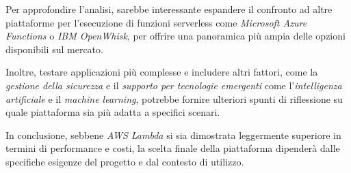 Per approfondire l’analisi, sarebbe interessante espandere il confronto ad altre piattaforme per l'esecuzione di funzioni serverless come \textit{Microsoft Azure Functions} o \textit{IBM OpenWhisk}, per offrire una panoramica più ampia delle opzioni disponibili sul mercato. 

Inoltre, testare applicazioni più complesse e includere altri fattori, come la \textit{gestione della sicurezza} e il \textit{supporto per tecnologie emergenti} come l'\textit{intelligenza artificiale} e il \textit{machine learning}, potrebbe fornire ulteriori spunti di riflessione su quale piattaforma sia più adatta a specifici scenari.

In conclusione, sebbene \textit{AWS Lambda} si sia dimostrata leggermente superiore in termini di performance e costi, la scelta finale della piattaforma dipenderà dalle specifiche esigenze del progetto e dal contesto di utilizzo.